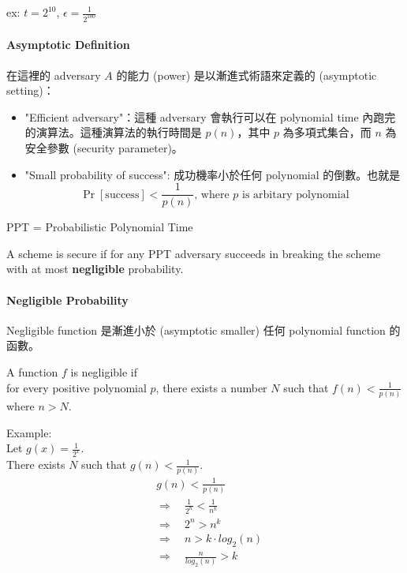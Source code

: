 ex: \(t = 2^{10}\), \(\epsilon = \displaystyle\frac{1}{2^{100}}\)


\paragraph{Asymptotic Definition}

在這裡的 adversary \(A\) 的能力 (power) 是以漸進式術語來定義的 (asymptotic setting)：
\begin{itemize}
	\item "Efficient adversary"：這種 adversary 會執行可以在 polynomial time 內跑完的演算法。這種演算法的執行時間是 \(p(n)\)，其中 \(p\) 為多項式集合，而 \(n\) 為安全參數 (security parameter)。
	
	\item "Small probability of success": 成功機率小於任何 polynomial 的倒數。也就是
	\[\Pr[\mathrm{success}] < \frac{1}{p(n)} \text{, where } p \text{ is arbitary polynomial}\]
\end{itemize}

PPT = Probabilistic Polynomial Time

\begin{definition}
	A scheme is secure if for any PPT adversary succeeds in breaking the scheme with at most \textbf{negligible} probability.
\end{definition}


\paragraph{Negligible Probability}

Negligible function 是漸進小於 (asymptotic smaller) 任何 polynomial function 的函數。

\begin{definition}
	A function \(f\) is negligible if \\
	for every positive polynomial \(p\), there exists a number \(N\) such that \(f(n) < \displaystyle\frac{1}{p(n)}\) where \(n > N\).
\end{definition}

Example: \\
Let \(g(x) = \displaystyle\frac{1}{2^x}\). \\
There exists \(N\) such that \(g(n) < \displaystyle\frac{1}{p(n)}\). \\
\begin{align*}
	&g(n) < \frac{1}{p(n)} \\
	&\Rightarrow \quad \frac{1}{2^n} < \frac{1}{n^k} \tag{k is positive constant} \\
	&\Rightarrow \quad 2^n > n^k \\
	&\Rightarrow \quad n > k \cdot log_2(n) \\
	&\Rightarrow \quad \frac{n}{log_2(n)} > k
\end{align*}

